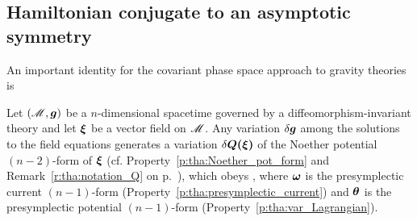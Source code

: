 \subsection{Hamiltonian conjugate to an asymptotic symmetry}

An important identity for the covariant phase space approach to
gravity theories is

\begin{prop}
Let $(\mathscr{M},\bm{g})$ be a $n$-dimensional spacetime governed by a
diffeomorphism-invariant theory and let $\bm{\xi}$ be a vector field on $\mathscr{M}$.
Any variation $\delta\bm{g}$ among the solutions to the field equations
generates a variation $\delta\bm{Q}\textbf{(}\bm{\xi}\textbf{)}$ of the
Noether potential $(n-2)$-form of $\bm{\xi}$ (cf. Property~\ref{p:tha:Noether_pot_form}
and Remark~\ref{r:tha:notation_Q} on p.~\pageref{r:tha:notation_Q}),
which obeys
\be \label{e:tha:fund_identity}
    ,
\ee
where $\bm{\omega}$ is the presymplectic current $(n-1)$-form (Property~\ref{p:tha:presymplectic_current}) and $\bm{\theta}$ is
the presymplectic potential $(n-1)$-form (Property~\ref{p:tha:var_Lagrangian}).
\end{prop}

